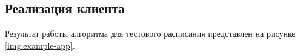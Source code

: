 \subsection{Реализация клиента}

Результат работы алгоритма для тестового расписания представлен на рисунке \ref{img:example-app}.


\clearpage